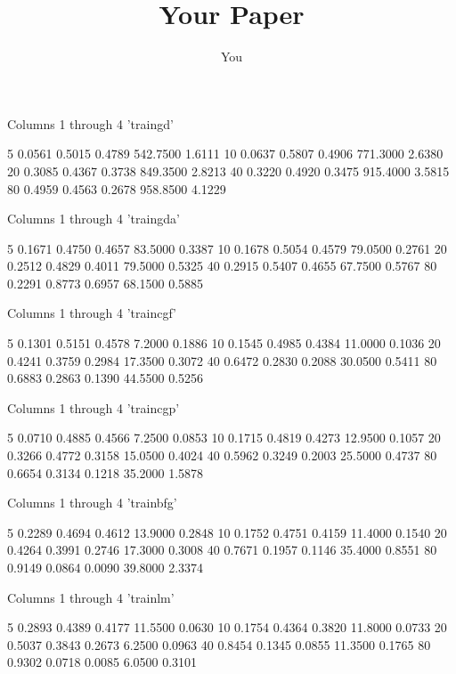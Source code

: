 \documentclass[a4paper]{article}
\title{Your Paper}
\author{You}
\begin{document}
\maketitle

  Columns 1 through 4 'traingd'

    5    0.0561    0.5015    0.4789    542.7500    1.6111
   10    0.0637    0.5807    0.4906    771.3000    2.6380
   20    0.3085    0.4367    0.3738    849.3500    2.8213
   40    0.3220    0.4920    0.3475    915.4000    3.5815
   80    0.4959    0.4563    0.2678    958.8500    4.1229

  Columns 1 through 4 'traingda'

    5    0.1671    0.4750    0.4657    83.5000    0.3387
   10    0.1678    0.5054    0.4579    79.0500    0.2761
   20    0.2512    0.4829    0.4011    79.5000    0.5325
   40    0.2915    0.5407    0.4655    67.7500    0.5767
   80    0.2291    0.8773    0.6957    68.1500    0.5885

  Columns 1 through 4 'traincgf'

    5    0.1301    0.5151    0.4578     7.2000    0.1886
   10    0.1545    0.4985    0.4384    11.0000    0.1036
   20    0.4241    0.3759    0.2984    17.3500    0.3072
   40    0.6472    0.2830    0.2088    30.0500    0.5411
   80    0.6883    0.2863    0.1390    44.5500    0.5256

  Columns 1 through 4 'traincgp'

    5    0.0710    0.4885    0.4566     7.2500    0.0853
   10    0.1715    0.4819    0.4273    12.9500    0.1057
   20    0.3266    0.4772    0.3158    15.0500    0.4024
   40    0.5962    0.3249    0.2003    25.5000    0.4737
   80    0.6654    0.3134    0.1218    35.2000    1.5878

  Columns 1 through 4 'trainbfg'

    5    0.2289    0.4694    0.4612    13.9000    0.2848
   10    0.1752    0.4751    0.4159    11.4000    0.1540
   20    0.4264    0.3991    0.2746    17.3000    0.3008
   40    0.7671    0.1957    0.1146    35.4000    0.8551
   80    0.9149    0.0864    0.0090    39.8000    2.3374

  Columns 1 through 4 'trainlm'

    5    0.2893    0.4389    0.4177    11.5500    0.0630
   10    0.1754    0.4364    0.3820    11.8000    0.0733
   20    0.5037    0.3843    0.2673     6.2500    0.0963
   40    0.8454    0.1345    0.0855    11.3500    0.1765
   80    0.9302    0.0718    0.0085     6.0500    0.3101
\end{document}
